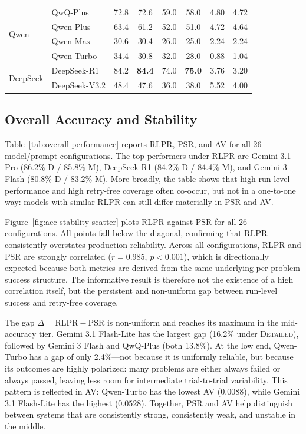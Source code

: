 \documentclass[11pt]{article}
\begin{document}
\begin{table}[t]
{\begin{tabular}{llcccccc}
\midrule
\multirow{4}{*}{Qwen}
  & QwQ-Plus   & 72.8 & 72.6 & 59.0 & 58.0 & 4.80 & 4.72 \\
  & Qwen-Plus  & 63.4 & 61.2 & 52.0 & 51.0 & 4.72 & 4.64 \\
  & Qwen-Max   & 30.6 & 30.4 & 26.0 & 25.0 & 2.24 & 2.24 \\
  & Qwen-Turbo & 34.4 & 30.8 & 32.0 & 28.0 & 0.88 & 1.04 \\
\midrule
\multirow{2}{*}{DeepSeek}
  & DeepSeek-R1   & 84.2 & \textbf{84.4} & 74.0 & \textbf{75.0} & 3.76 & 3.20 \\
  & DeepSeek-V3.2 & 48.4 & 47.6 & 36.0 & 38.0 & 5.52 & 4.00 \\
\bottomrule
\end{tabular}
}
\end{table}

\subsection{Overall Accuracy and Stability}
Table~\ref{tab:overall-performance} reports RLPR, PSR, and AV for all 26 model/prompt configurations. The top performers under RLPR are Gemini 3.1 Pro (86.2\% D / 85.8\% M), DeepSeek-R1 (84.2\% D / 84.4\% M), and Gemini 3 Flash (80.8\% D / 83.2\% M). More broadly, the table shows that high run-level performance and high retry-free coverage often co-occur, but not in a one-to-one way: models with similar RLPR can still differ materially in PSR and AV.

Figure~\ref{fig:acc-stability-scatter} plots RLPR against PSR for all 26 configurations. All points fall below the diagonal, confirming that RLPR consistently overstates production reliability. Across all configurations, RLPR and PSR are strongly correlated ($r=0.985$, $p<0.001$), which is directionally expected because both metrics are derived from the same underlying per-problem success structure. The informative result is therefore not the existence of a high correlation itself, but the persistent and non-uniform gap between run-level success and retry-free coverage.

The gap $\Delta = \mathrm{RLPR} - \mathrm{PSR}$ is non-uniform and reaches its maximum in the mid-accuracy tier. Gemini 3.1 Flash-Lite has the largest gap (16.2\% under \textsc{Detailed}), followed by Gemini 3 Flash and QwQ-Plus (both 13.8\%). At the low end, Qwen-Turbo has a gap of only 2.4\%---not because it is uniformly reliable, but because its outcomes are highly polarized: many problems are either always failed or always passed, leaving less room for intermediate trial-to-trial variability. This pattern is reflected in AV: Qwen-Turbo has the lowest AV ($0.0088$), while Gemini 3.1 Flash-Lite has the highest ($0.0528$). Together, PSR and AV help distinguish between systems that are consistently strong, consistently weak, and unstable in the middle.
\end{document}
